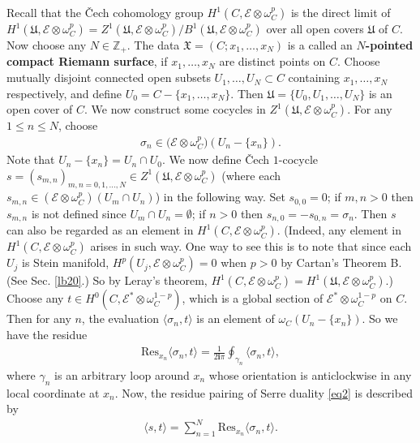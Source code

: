 \documentclass[12pt,b5paper,notitlepage]{report}
\theoremstyle{definition}
\theoremstyle{plain}
\newcommand{\fk}{\mathfrak}
\newcommand{\mc}{\mathcal}
\newcommand{\Res}{\mathrm{Res}}
\newcommand{\bk}[1]{\langle {#1}\rangle}
\newcommand{\scr}{\mathscr}
\newcommand{\im}{\mathbf{i}}
\numberwithin{equation}{section}
\begin{document}
Recall that the \v{C}ech cohomology group $H^1(C,\scr E\otimes \omega_C^p)$ is the direct limit of $H^1(\fk U,\scr E\otimes \omega_C^p)={Z^1(\fk U,\scr E\otimes \omega_C^p)}/{B^1(\fk U,\scr E\otimes \omega_C^p)}$ over all open covers $\fk U$ of $C$. Now choose any $N\in\mathbb Z_+$.  The data $\fk X=(C;x_1,\dots,x_N)$ is a called an \textbf{$N$-pointed compact Riemann surface}, if $x_1,\dots,x_N$ are distinct points on $C$. Choose mutually disjoint connected open subsets $U_1,\dots,U_N\subset C$ containing $x_1,\dots,x_N$ respectively, and define $U_0=C-\{x_1,\dots,x_N\}$. Then $\fk U=\{U_0,U_1,\dots,U_N\}$ is an open cover of $C$.  We now construct some cocycles in $Z^{1}(\fk U,\scr E\otimes \omega_C^p)$. For any $1\leq n\leq N$, choose
\begin{align*}
\sigma_n\in\mc (\scr E\otimes\omega_C^p)(U_n-\{x_n\}).
\end{align*}
Note that $U_n-\{x_n\}=U_n\cap U_0$. We now define \v{C}ech $1$-cocycle $s=(s_{m,n})_{m,n=0,1,\dots,N }\in Z^{1}(\fk U,\scr E\otimes \omega_C^p)$ (where each $s_{m,n}\in (\scr E\otimes\omega_C^p)(U_m\cap U_n)$) in the following way. Set $s_{0,0}=0$; if $m,n> 0$ then $s_{m,n}$ is not defined since $U_m\cap U_n=\emptyset$; if $n>0$ then $s_{n,0}=-s_{0,n}=\sigma_n$. Then $s$ can also be regarded as an element in $H^1(C,\scr E\otimes \omega_C^p)$. (Indeed, any element in $H^1(C,\scr E\otimes \omega_C^p)$ arises in such way. One way to see this is to note that since each $U_j$ is Stein manifold, $H^p(U_j,\scr E\otimes\omega_C^p)=0$ when $p>0$ by Cartan's Theorem B. (See Sec. \ref{lb20}.) So by Leray's theorem, $H^1(C,\scr E\otimes \omega_C^p)=H^1(\fk U,\scr E\otimes \omega_C^p)$.)  Choose any $t\in H^0(C,\scr E^*\otimes\omega_C^{1-p})$, which is a global section of $\scr E^*\otimes\omega_C^{1-p}$ on $C$. Then for any $n$, the evaluation $\bk{\sigma_n,t}$ is an element of $\omega_C(U_n-\{x_n\})$. So we have the residue
\begin{align}\label{eq1}
\Res_{x_n}\bk{\sigma_n,t}=\frac{1}{2\im\pi}\oint_{\gamma_n}\bk{\sigma_n,t},
\end{align}
where $\gamma_n$ is an arbitrary loop around $x_n$ whose orientation is anticlockwise in any local coordinate at $x_n$.  Now, the residue pairing of Serre duality \eqref{eq2} is described by
\begin{align}
\bk{s,t}=\sum_{n=1}^N\Res_{x_n}\bk{\sigma_n,t}.
\end{align}
\end{document}
